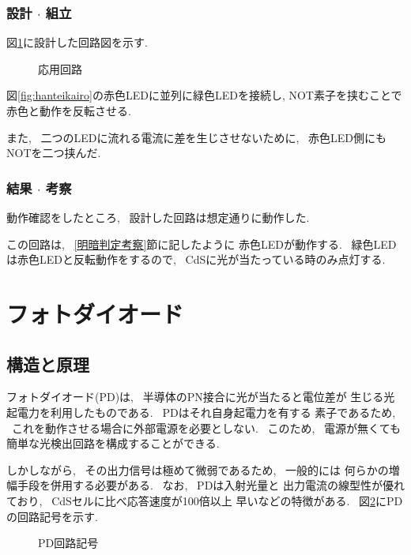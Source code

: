 \documentclass[titlepage]{jsarticle}
\begin{document}
        \subsubsection{設計 $\cdot$ 組立}
            図\ref{fig:応用回路}に設計した回路図を示す.
            
            \begin{figure}[ht]
                \centering
                \caption{応用回路}
                \label{fig:応用回路}
            \end{figure}

            図\ref{fig:hanteikairo}の赤色LEDに並列に緑色LEDを接続し,
            NOT素子を挟むことで赤色と動作を反転させる.

            また, ~二つのLEDに流れる電流に差を生じさせないために,
            ~赤色LED側にもNOTを二つ挟んだ.
        
        \subsubsection{結果 $\cdot$ 考察}
            動作確認をしたところ, ~設計した回路は想定通りに動作した.
            
            この回路は, ~\ref{明暗判定考察}節に記したように
            赤色LEDが動作する. ~緑色LEDは赤色LEDと反転動作をするので,
            ~CdSに光が当たっている時のみ点灯する.

\section{フォトダイオード}
    \subsection{構造と原理}
        フォトダイオード(PD)は, ~半導体のPN接合に光が当たると電位差が
        生じる光起電力を利用したものである. ~PDはそれ自身起電力を有する
        素子であるため, ~これを動作させる場合に外部電源を必要としない.
        ~このため, ~電源が無くても簡単な光検出回路を構成することができる.
        
        しかしながら, ~その出力信号は極めて微弱であるため, ~一般的には
        何らかの増幅手段を併用する必要がある. ~なお, ~PDは入射光量と
        出力電流の線型性が優れており, ~CdSセルに比べ応答速度が100倍以上
        早いなどの特徴がある. ~図\ref{fig:PD}にPDの回路記号を示す.

        \begin{figure}[ht]
            \centering
            \caption{PD回路記号}
            \label{fig:PD}
        \end{figure}
\end{document}
